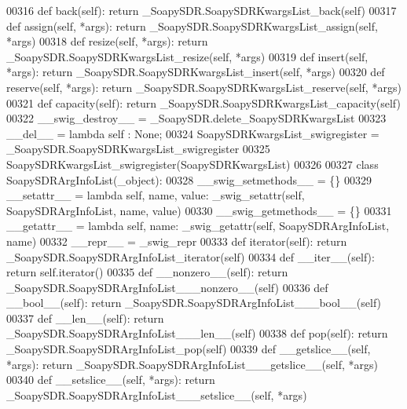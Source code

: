 \begin{DoxyCode}
{{{{00316     \textcolor{keyword}{def }back(self): \textcolor{keywordflow}{return} \_SoapySDR.SoapySDRKwargsList\_back(self)
00317     \textcolor{keyword}{def }assign(self, *args): \textcolor{keywordflow}{return} \_SoapySDR.SoapySDRKwargsList\_assign(self, *args)
00318     \textcolor{keyword}{def }resize(self, *args): \textcolor{keywordflow}{return} \_SoapySDR.SoapySDRKwargsList\_resize(self, *args)
00319     \textcolor{keyword}{def }insert(self, *args): \textcolor{keywordflow}{return} \_SoapySDR.SoapySDRKwargsList\_insert(self, *args)
00320     \textcolor{keyword}{def }reserve(self, *args): \textcolor{keywordflow}{return} \_SoapySDR.SoapySDRKwargsList\_reserve(self, *args)
00321     \textcolor{keyword}{def }capacity(self): \textcolor{keywordflow}{return} \_SoapySDR.SoapySDRKwargsList\_capacity(self)
00322     \_\_swig\_destroy\_\_ = \_SoapySDR.delete\_SoapySDRKwargsList
00323     \_\_del\_\_ = \textcolor{keyword}{lambda} self : \textcolor{keywordtype}{None};
00324 SoapySDRKwargsList\_swigregister = \_SoapySDR.SoapySDRKwargsList\_swigregister
00325 SoapySDRKwargsList_swigregister(SoapySDRKwargsList)
00326 
00327 \textcolor{keyword}{class }SoapySDRArgInfoList(_object):
00328     \_\_swig\_setmethods\_\_ = \{\}
00329     \_\_setattr\_\_ = \textcolor{keyword}{lambda} self, name, value: _swig_setattr(self, SoapySDRArgInfoList, name, value)
00330     \_\_swig\_getmethods\_\_ = \{\}
00331     \_\_getattr\_\_ = \textcolor{keyword}{lambda} self, name: _swig_getattr(self, SoapySDRArgInfoList, name)
00332     \_\_repr\_\_ = \_swig\_repr
00333     \textcolor{keyword}{def }iterator(self): \textcolor{keywordflow}{return} \_SoapySDR.SoapySDRArgInfoList\_iterator(self)
00334     \textcolor{keyword}{def }__iter__(self): \textcolor{keywordflow}{return} self.iterator()
00335     \textcolor{keyword}{def }__nonzero__(self): \textcolor{keywordflow}{return} \_SoapySDR.SoapySDRArgInfoList\_\_\_nonzero\_\_(self)
00336     \textcolor{keyword}{def }__bool__(self): \textcolor{keywordflow}{return} \_SoapySDR.SoapySDRArgInfoList\_\_\_bool\_\_(self)
00337     \textcolor{keyword}{def }__len__(self): \textcolor{keywordflow}{return} \_SoapySDR.SoapySDRArgInfoList\_\_\_len\_\_(self)
00338     \textcolor{keyword}{def }pop(self): \textcolor{keywordflow}{return} \_SoapySDR.SoapySDRArgInfoList\_pop(self)
00339     \textcolor{keyword}{def }__getslice__(self, *args): \textcolor{keywordflow}{return} \_SoapySDR.SoapySDRArgInfoList\_\_\_getslice\_\_(self, *args)
00340     \textcolor{keyword}{def }__setslice__(self, *args): \textcolor{keywordflow}{return} \_SoapySDR.SoapySDRArgInfoList\_\_\_setslice\_\_(self, *args)
}}}}
\end{DoxyCode}
